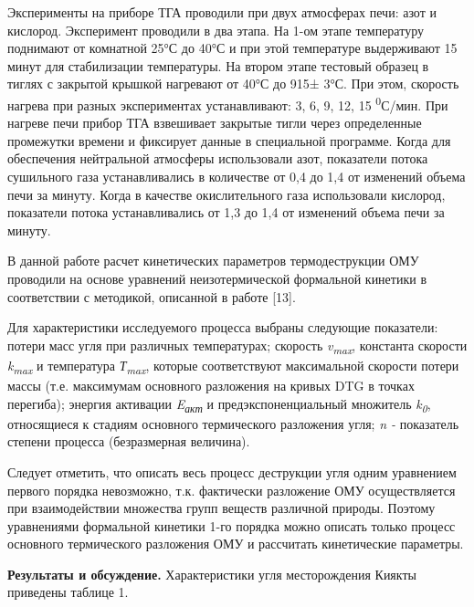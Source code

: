 \begin{multicols}{2}
Эксперименты на приборе ТГА проводили при двух атмосферах печи: азот и
кислород. Эксперимент проводили в два этапа. На 1-ом этапе температуру
поднимают от комнатной 25°С до 40°С и при этой температуре выдерживают
15 минут для стабилизации температуры. На втором этапе тестовый образец
в тиглях с закрытой крышкой нагревают от 40°С до 915± 3°С. При этом,
скорость нагрева при разных экспериментах устанавливают: 3, 6, 9, 12, 15
\textsuperscript{0}С/мин. При нагреве печи прибор ТГА взвешивает
закрытые тигли через определенные промежутки времени и фиксирует данные
в специальной программе. Когда для обеспечения нейтральной атмосферы
использовали азот, показатели потока сушильного газа устанавливались в
количестве от 0,4 до 1,4 от изменений объема печи за минуту. Когда в
качестве окислительного газа использовали кислород, показатели потока
устанавливались от 1,3 до 1,4 от изменений объема печи за минуту.

В данной работе расчет кинетических параметров термодеструкции ОМУ
проводили на основе уравнений неизотермической формальной кинетики в
соответствии с методикой, описанной в работе {[}13{]}.

Для характеристики исследуемого процесса выбраны следующие показатели:
потери масс угля при различных температурах; скорость
\emph{v\textsubscript{max}}, константа скорости
\emph{k\textsubscript{max}} и температура \emph{Т\textsubscript{max}},
которые соответствуют максимальной скорости потери массы (т.е.
максимумам основного разложения на кривых DTG в точках перегиба);
энергия активации \emph{E\textsubscript{акт }}и предэкспоненциальный
множитель \emph{k\textsubscript{0}}, относящиеся к стадиям основного
термического разложения угля; \emph{n -} показатель степени процесса
(безразмерная величина).

Следует отметить, что описать весь процесс деструкции угля одним
уравнением первого порядка невозможно, т.к. фактически разложение ОМУ
осуществляется при взаимодействии множества групп веществ различной
природы. Поэтому уравнениями формальной кинетики 1-го порядка можно
описать только процесс основного термического разложения ОМУ и
рассчитать кинетические параметры.

{\bfseries Результаты и обсуждение.} Характеристики угля месторождения
Киякты приведены таблице 1.
\end{multicols}

